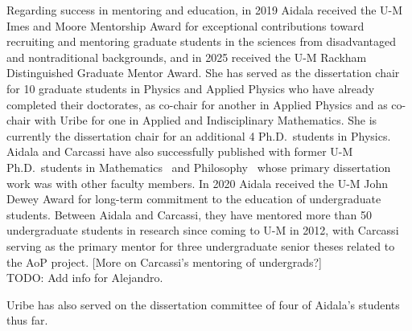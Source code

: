 Regarding success in mentoring and education, in 2019 Aidala received the U-M Imes and Moore Mentorship Award for exceptional contributions toward recruiting and mentoring graduate students in the sciences from disadvantaged and nontraditional backgrounds, and in 2025 received the U-M Rackham Distinguished Graduate Mentor Award.  She has served as the dissertation chair for 10 graduate students in Physics and Applied Physics who have already completed their doctorates, as co-chair for another in Applied Physics and as co-chair with Uribe for one in Applied and Indisciplinary Mathematics.  She is currently the dissertation chair for an additional 4 Ph.D.~students in Physics.  Aidala and Carcassi have also successfully published with former U-M Ph.D.~students in Mathematics~\cite{aop-topExpDisting} and Philosophy~\cite{aop-HamPriv,aop-unphysHilbert} whose primary dissertation work was with other faculty members.  In 2020 Aidala received the U-M John Dewey Award for long-term commitment to the education of undergraduate students.  Between Aidala and Carcassi, they have mentored more than 50 undergraduate students in research since coming to U-M in 2012, with Carcassi serving as the primary mentor for three undergraduate senior theses related to the AoP project.  [More on Carcassi's mentoring of undergrads?]\\


TODO: Add info for Alejandro.  

Uribe has also served on the dissertation committee of four of Aidala's students thus far.

